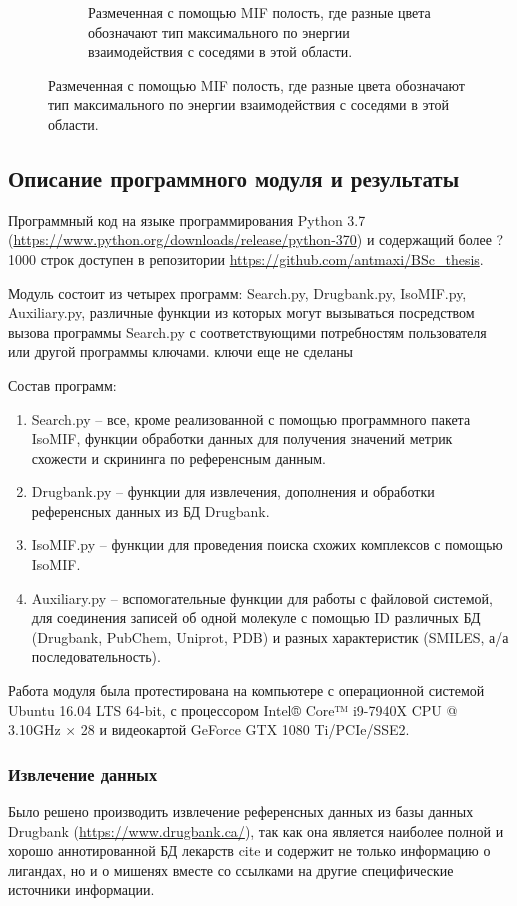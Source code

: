 \documentclass[a4paper,14pt]{article}         %
\begin{document}
\begin{figure}
\begin{subfigure}{.45\textwidth}
		\caption{Размеченная с помощью MIF полость, где разные цвета обозначают тип максимального по энергии взаимодействия с соседями в этой области.}
		\label{fig:sfig1}
	\end{subfigure}
\end{figure}
\newpage
\subsection{Описание программного модуля и результаты}
Программный код на языке программирования Python 3.7 \linebreak(\href{https://www.python.org/downloads/release/python-370}{https://www.python.org/downloads/release/python-370}) и содержащий более ?1000 строк доступен в репозитории \href{https://github.com/antmaxi/BSc\_thesis}{https://github.com/antmaxi/BSc\_thesis}.

Модуль состоит из четырех программ: Search.py, Drugbank.py, IsoMIF.py, Auxiliary.py, различные функции из которых могут вызываться посредством вызова программы Search.py с соответствующими потребностям пользователя или другой программы ключами. \color{orange} ключи еще не сделаны \color{black}

Состав программ:
\begin{enumerate}
	\item Search.py -- все, кроме реализованной с помощью программного пакета IsoMIF, функции обработки данных для получения значений метрик схожести и скрининга по референсным данным.
	\item Drugbank.py -- функции для извлечения, дополнения и обработки референсных данных из БД Drugbank.
	\item IsoMIF.py -- функции для проведения поиска схожих комплексов с помощью IsoMIF.
	\item Auxiliary.py -- вспомогательные функции для работы с файловой системой, для соединения записей об одной молекуле с помощью ID различных БД (Drugbank, PubChem, Uniprot, PDB) и разных характеристик (SMILES, а/а последовательность).
\end{enumerate}

Работа модуля была протестирована на компьютере с операционной системой Ubuntu 16.04 LTS 64-bit, с процессором Intel® Core™ i9-7940X CPU @ 3.10GHz $\times$ 28 и видеокартой GeForce GTX 1080 Ti/PCIe/SSE2.
\subsubsection{Извлечение данных}
Было решено производить извлечение референсных данных из базы данных Drugbank (\href{https://www.drugbank.ca/}{https://www.drugbank.ca/}), так как она является наиболее полной и хорошо аннотированной БД лекарств cite{} и содержит не только информацию о лигандах, но и о мишенях вместе со ссылками на другие специфические источники информации. 
\end{document}

